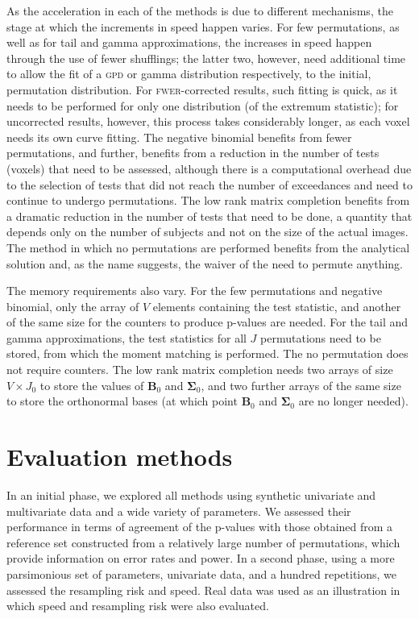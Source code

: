 As the acceleration in each of the methods is due to different mechanisms, the stage at which the increments in speed happen varies. For few permutations, as well as for tail and gamma approximations, the increases in speed happen through the use of fewer shufflings; the latter two, however, need additional time to allow the fit of a \textsc{gpd} or gamma distribution respectively, to the initial, permutation distribution. For \textsc{fwer}-corrected results, such fitting is quick, as it needs to be performed for only one distribution (of the extremum statistic); for uncorrected results, however, this process takes considerably longer, as each voxel needs its own curve fitting. The negative binomial benefits from fewer permutations, and further, benefits from a reduction in the number of tests (voxels) that need to be assessed, although there is a computational overhead due to the selection of tests that did not reach the number of exceedances and need to continue to undergo permutations. The low rank matrix completion benefits from a dramatic reduction in the number of tests that need to be done, a quantity that depends only on the number of subjects and not on the size of the actual images. The method in which no permutations are performed benefits from the analytical solution and, as the name suggests, the waiver of the need to permute anything.

The memory requirements also vary. For the few permutations and negative binomial, only the array of $V$ elements containing the test statistic, and another of the same size for the counters to produce p-values are needed. For the tail and gamma approximations, the test statistics for all $J$ permutations need to be stored, from which the moment matching is performed. The no permutation does not require counters. The low rank matrix completion needs two arrays of size $V \times J_0$ to store the values of $\mathbf{B}_0$ and $\boldsymbol{\Sigma}_0$, and two further arrays of the same size to store the orthonormal bases (at which point $\mathbf{B}_0$ and $\boldsymbol{\Sigma}_0$ are no longer needed).

\section{Evaluation methods}
\label{sec:accel:evaluation}

In an initial phase, we explored all methods using synthetic univariate and multivariate data and a wide variety of parameters. We assessed their performance in terms of agreement of the p-values with those obtained from a reference set constructed from a relatively large number of permutations, which provide information on error rates and power. In a second phase, using a more parsimonious set of parameters, univariate data, and a hundred repetitions, we assessed the resampling risk and speed. Real data was used as an illustration in which speed and resampling risk were also evaluated.


